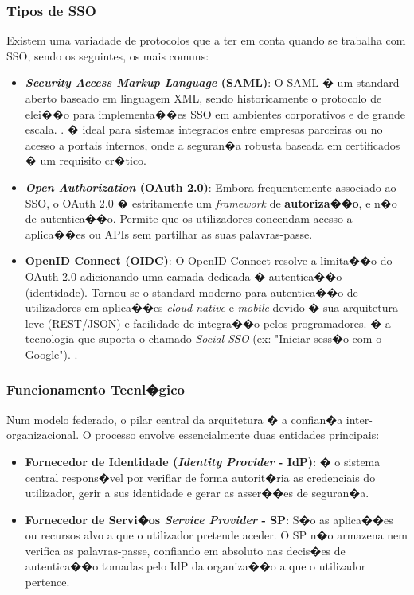 \subsubsection{Tipos de SSO}
Existem uma variadade de protocolos que a ter em conta quando se trabalha com SSO, sendo os seguintes, os mais comuns:
\begin{itemize}
    \item \textbf{\textit{Security Access Markup Language} (SAML)}: O SAML � um standard aberto baseado em linguagem XML, sendo historicamente o protocolo de elei��o para implementa��es SSO em ambientes corporativos e de grande escala. \cite{SSOTechPrescient}. � ideal para sistemas integrados entre empresas parceiras ou no acesso a portais internos, onde a seguran�a robusta baseada em certificados � um requisito cr�tico. \cite{OIDCvsSAML}
    \item \textbf{\textit{Open Authorization} (OAuth 2.0)}: Embora frequentemente associado ao SSO, o OAuth 2.0 � estritamente um \textit{framework} de \textbf{autoriza��o}, e n�o de autentica��o. Permite que os utilizadores concendam acesso a aplica��es ou APIs sem partilhar as suas palavras-passe. \cite{DiffSSOMiniOrange}
    \item \textbf{OpenID Connect (OIDC)}: O OpenID Connect resolve a limita��o do OAuth 2.0 adicionando uma camada dedicada � autentica��o (identidade). Tornou-se o standard moderno para autentica��o de utilizadores em aplica��es \textit{cloud-native} e \textit{mobile} devido � sua arquitetura leve (REST/JSON) e facilidade de integra��o pelos programadores. � a tecnologia que suporta o chamado \textit{Social SSO} (ex: "Iniciar sess�o com o Google"). \cite{SSOTechPrescient}.
\end{itemize}

\subsubsection{Funcionamento Tecnl�gico}
Num modelo federado, o pilar central da arquitetura � a confian�a inter-organizacional.
O processo envolve essencialmente duas entidades principais:

\begin{itemize}
    \item \textbf{Fornecedor de Identidade (\textit{Identity Provider} - IdP)}: � o sistema central respons�vel por verifiar de forma autorit�ria as credenciais do utilizador, gerir a sus identidade e gerar as asser��es de seguran�a.
    \item \textbf{Fornecedor de Servi�os \textit{Service Provider} - SP}: S�o as aplica��es ou recursos alvo a que o utilizador pretende aceder. O SP n�o armazena nem verifica as palavras-passe, confiando em absoluto nas decis�es de autentica��o tomadas pelo IdP da organiza��o a que o utilizador pertence. 
\end{itemize}

